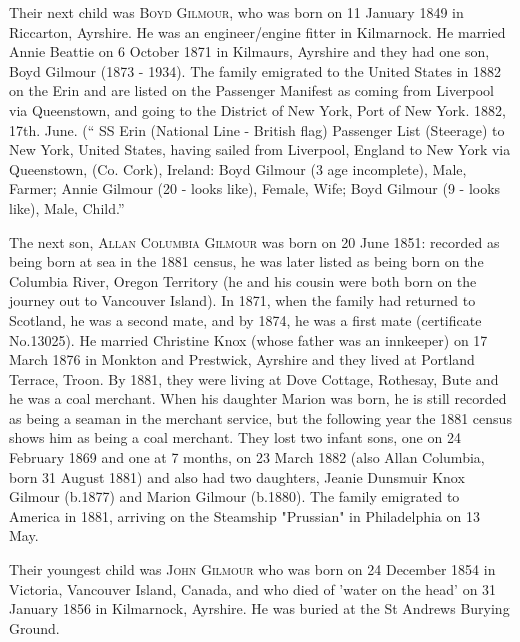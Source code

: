 Their next child was \textsc{Boyd Gilmour}, who was born on 11 January 1849 in Riccarton, Ayrshire. He was an engineer/engine fitter in Kilmarnock. He married Annie Beattie on 6 October 1871 in Kilmaurs, Ayrshire and they had one son, Boyd Gilmour (1873 - 1934). The family emigrated to the United States in 1882 on the Erin and are listed on the Passenger Manifest as coming from Liverpool via Queenstown, and going to the District of New York, Port of New York. 1882, 17th. June. (`` SS Erin (National Line - British flag) Passenger List (Steerage) to New York, United States, having sailed from Liverpool, England to New York via Queenstown, (Co. Cork), Ireland: Boyd Gilmour (3 age incomplete), Male, Farmer; Annie Gilmour (20 - looks like), Female, Wife; Boyd Gilmour (9 - looks like), Male, Child.''

The next son, \textsc{Allan Columbia Gilmour} was born on 20 June 1851: recorded as being born at sea in the 1881 census, he was later listed as being born on the Columbia River, Oregon Territory (he and his cousin were both born on the journey out to Vancouver Island). In 1871, when the family had returned to Scotland, he was a second mate, and by 1874, he was a first mate (certificate No.13025). He married Christine Knox (whose father was an innkeeper) on 17 March 1876 in Monkton and Prestwick, Ayrshire and they lived at Portland Terrace, Troon. By 1881, they were living at Dove Cottage, Rothesay, Bute and he was a coal merchant.   When his daughter Marion was born, he is still recorded as being a seaman in the merchant service, but the following year the 1881 census shows him as being a coal merchant. They lost two infant sons, one on 24 February 1869 and one at 7 months, on 23 March 1882 (also Allan Columbia, born 31 August 1881) and also had two daughters, Jeanie Dunsmuir Knox Gilmour (b.1877) and Marion Gilmour (b.1880). The family emigrated to America in 1881, arriving on the Steamship "Prussian" in Philadelphia on 13 May.

Their youngest child was \textsc{John Gilmour} who was born on 24 December 1854 in Victoria, Vancouver Island, Canada, and who died of 'water on the head' on 31 January 1856 in Kilmarnock, Ayrshire. He was buried at the St Andrews Burying Ground.



  

